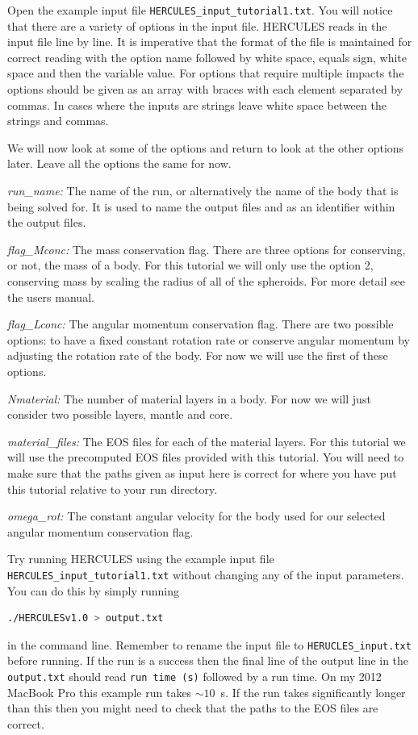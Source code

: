 \documentclass[11pt, oneside]{article}   	%
\begin{document}
Open the example input file  \texttt{HERCULES\_input\_tutorial1.txt}. You will notice that there are a variety of options in the input file. HERCULES reads in the input file line by line. It is imperative that the format of the file is maintained for correct reading with the option name followed by white space, equals sign, white space and then the variable value. For options that require multiple impacts the options should be given as an array with braces with each element separated by commas. In cases where the inputs are strings leave white space between the strings and commas.

We will now look at some of the options and return to look at the other options later. Leave all the options the same for now.

\setlength{\parskip}{15pt}
\setlength{\leftskip}{1.5cm}
\setlength{\parindent}{-1.5cm}

 {\it run\_name:} The name of the run, or alternatively the name of the body that is being solved for. It is used to name the output files and as an identifier within the output files.

 {\it flag\_Mconc:} The mass conservation flag. There are three options for conserving, or not, the mass of a body. For this tutorial we will only use the option 2, conserving mass by scaling the radius of all of the spheroids. For more detail see the users manual.

 {\it flag\_Lconc:}  The angular momentum conservation flag. There are two possible options: to have a fixed constant rotation rate or conserve angular momentum by adjusting the rotation rate of the body. For now we will use the first of these options.

{\it Nmaterial:} The number of material layers in a body. For now we will just consider two possible layers, mantle and core.

{\it material\_files:} The EOS files for each of the material layers. For this tutorial we will use the precomputed EOS files provided with this tutorial. You will need to make sure that the paths given as input here is correct for where you have put this tutorial relative to your run directory. 

{\it omega\_rot:} The constant angular velocity for the body used for our selected angular momentum conservation flag. \\

\setlength{\leftskip}{0pt}
\setlength{\parskip}{0 pt}
\setlength{\parindent}{15pt} 

Try running HERCULES using the example input file \texttt{HERCULES\_input\_tutorial1.txt} without changing any of the input parameters. You can do this by simply running
\begin{lstlisting}[language=bash]
./HERCULESv1.0 > output.txt
\end{lstlisting}
in the command line. Remember to rename the input file to \texttt{HERUCLES\_input.txt} before running.
If the run is a success then the final line of the output line in the \texttt{output.txt} should read \texttt{run time (s)} followed by a run time. On my 2012 MacBook Pro this example run takes $\sim10$~s. If the run takes significantly longer than this then you might need to check that the paths to the EOS files are correct.
\end{document}
